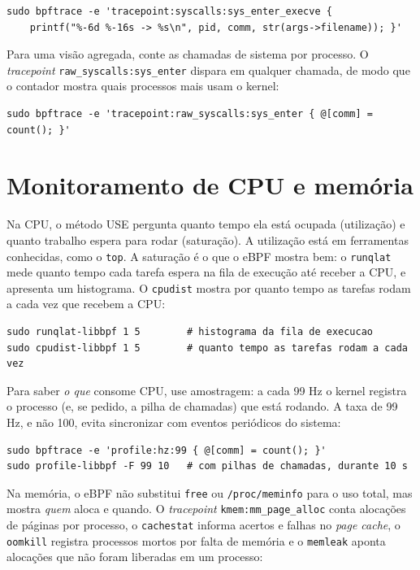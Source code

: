 \begin{lstlisting}
sudo bpftrace -e 'tracepoint:syscalls:sys_enter_execve {
    printf("%-6d %-16s -> %s\n", pid, comm, str(args->filename)); }'
\end{lstlisting}

Para uma visão agregada, conte as chamadas de sistema por processo. O \textit{tracepoint} \texttt{raw\_syscalls:sys\_enter} dispara em qualquer chamada, de modo que o contador mostra quais processos mais usam o kernel:

\begin{lstlisting}
sudo bpftrace -e 'tracepoint:raw_syscalls:sys_enter { @[comm] = count(); }'
\end{lstlisting}

\section{Monitoramento de CPU e memória}

Na CPU, o método USE pergunta quanto tempo ela está ocupada (utilização) e quanto trabalho espera para rodar (saturação). A utilização está em ferramentas conhecidas, como o \texttt{top}. A saturação é o que o eBPF mostra bem: o \texttt{runqlat} mede quanto tempo cada tarefa espera na fila de execução até receber a CPU, e apresenta um histograma. O \texttt{cpudist} mostra por quanto tempo as tarefas rodam a cada vez que recebem a CPU:

\begin{lstlisting}
sudo runqlat-libbpf 1 5        # histograma da fila de execucao
sudo cpudist-libbpf 1 5        # quanto tempo as tarefas rodam a cada vez
\end{lstlisting}

Para saber \textit{o que} consome CPU, use amostragem: a cada 99 Hz o kernel registra o processo (e, se pedido, a pilha de chamadas) que está rodando. A taxa de 99 Hz, e não 100, evita sincronizar com eventos periódicos do sistema:

\begin{lstlisting}
sudo bpftrace -e 'profile:hz:99 { @[comm] = count(); }'
sudo profile-libbpf -F 99 10   # com pilhas de chamadas, durante 10 s
\end{lstlisting}

Na memória, o eBPF não substitui \texttt{free} ou \texttt{/proc/meminfo} para o uso total, mas mostra \textit{quem} aloca e quando. O \textit{tracepoint} \texttt{kmem:mm\_page\_alloc} conta alocações de páginas por processo, o \texttt{cachestat} informa acertos e falhas no \textit{page cache}, o \texttt{oomkill} registra processos mortos por falta de memória e o \texttt{memleak} aponta alocações que não foram liberadas em um processo:

